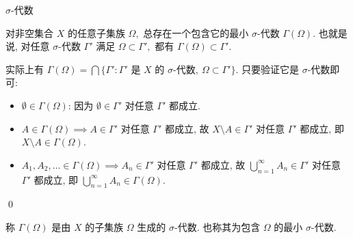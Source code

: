 \begin{frame}{$\sigma$-代数}

\begin{prop}
对非空集合 $X$ 的任意子集族 $\Omega,$ 总存在一个包含它的最小 $\sigma$-代数 $\Gamma(\Omega).$ 也就是说, 对任意 $\sigma$-代数 $\Gamma'$ 满足 $\Omega \subset \Gamma',$ 都有 $\Gamma(\Omega) \subset \Gamma'.$
\end{prop}

\pause

\startproof[bg=yellow, fg=red]
实际上有 $\Gamma(\Omega) = \bigcap\{\Gamma' : \Gamma' \text{ 是 } X \text{ 的 } \sigma\text{-代数},\ \Omega \subset \Gamma'\}.$ 只要验证它是 $\sigma$-代数即可:
\pause
\begin{itemize}
\item $\emptyset \in \Gamma(\Omega)$: 因为 $\emptyset \in \Gamma'$ 对任意 $\Gamma'$ 都成立.
\pause
\item $A \in \Gamma(\Omega) \implies A \in \Gamma'$ 对任意 $\Gamma'$ 都成立, 故 $X \setminus A \in \Gamma'$ 对任意 $\Gamma'$ 都成立, 即 $X \setminus A \in \Gamma(\Omega).$
\pause
\item $A_1, A_2, \ldots \in \Gamma(\Omega) \implies A_n \in \Gamma'$ 对任意 $\Gamma'$ 都成立, 故 $\bigcup_{n=1}^\infty A_n \in \Gamma'$ 对任意 $\Gamma'$ 都成立, 即 $\bigcup_{n=1}^\infty A_n \in \Gamma(\Omega).$
\end{itemize}
\qed

\pause

\begin{Def}
称 $\Gamma(\Omega)$ 是由 $X$ 的子集族 $\Omega$ 生成的 $\sigma$-代数. 也称其为包含 $\Omega$ 的最小 $\sigma$-代数.
\end{Def}

\end{frame}


